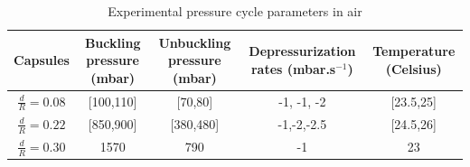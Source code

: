 \begin{table}[H]
	\centering
		\begin{adjustbox}{width=\textwidth}
			\begin{tabular}{|c|c|c|c|c|}
				\hline
				Capsules & Buckling pressure (mbar) & Unbuckling pressure (mbar) & Depressurization rates (mbar.s$^{-1}$) & Temperature (Celsius) \\
				\hline
				$\frac{d}{R} = 0.08$ & [100,110]& [70,80] & -1, -1, -2 & [23.5,25]\\
				$\frac{d}{R} = 0.22$ & [850,900] & [380,480] & -1,-2,-2.5 & [24.5,26]\\
				$\frac{d}{R} = 0.30$ & 1570 & 790 & -1 & 23 \\
				\hline
			\end{tabular}
		\end{adjustbox}
	\caption{Experimental pressure cycle parameters in air}
	\label{tab:Experimental_pressure_cycle_parameters_in_air}
\end{table}


